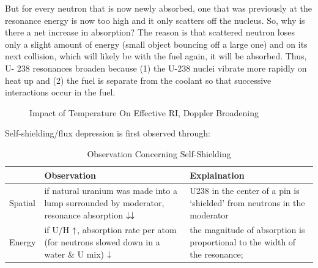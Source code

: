 \documentclass{school-22.211-notes}
\begin{document}
But for every neutron that is now newly absorbed, one that was previously at the
resonance energy is now too high and it only scatters off the nucleus. So, why is
there a net increase in absorption? The reason is that scattered neutron loses only
a slight amount of energy (small object bouncing off a large one) and on its next
collision, which will likely be with the fuel again, it will be absorbed. Thus, U-
238 resonances broaden because (1) the U-238 nuclei vibrate more rapidly on heat
up and (2) the fuel is separate from the coolant so that successive interactions
occur in the fuel.

\begin{figure}
  \centering
  \caption{Impact of Temperature On Effective RI, Doppler Broadening} \label{Doppler}
\end{figure}


\clearpage
Self-shielding/flux depression is first observed through: 
\begin{table}[ht]
  \centering
  \begin{tabular}{|l|p{6cm}|p{6cm}|} \hline
    & Observation & Explaination \\ \hline
    Spatial 
    & if natural uranium was made into a lump surrounded by moderator, resonance absorption $\downarrow \downarrow$  
    & U238 in the center of a pin is `shielded' from neutrons in the moderator \\ \hline
    Energy
    & if U/H $\uparrow$, absorption rate per atom (for neutrons slowed down in a water \& U mix) $\downarrow$   
    & the magnitude of absorption is proportional to the width of the resonance;  \\ \hline
  \end{tabular}
  \caption{Observation Concerning Self-Shielding}
  \end{table}
\end{document}
